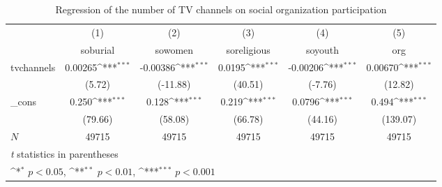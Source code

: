 \begin{table}[htbp]\centering
\def\sym#1{\ifmmode^{#1}\else\(^{#1}\)\fi}
\caption{Regression of the number of TV channels on social organization participation\label{tab1}}
\begin{tabular}{l*{5}{c}}
\hline\hline
            &\multicolumn{1}{c}{(1)}&\multicolumn{1}{c}{(2)}&\multicolumn{1}{c}{(3)}&\multicolumn{1}{c}{(4)}&\multicolumn{1}{c}{(5)}\\
            &\multicolumn{1}{c}{soburial}&\multicolumn{1}{c}{sowomen}&\multicolumn{1}{c}{soreligious}&\multicolumn{1}{c}{soyouth}&\multicolumn{1}{c}{org}\\
\hline
tvchannels  &     0.00265\sym{***}&    -0.00386\sym{***}&      0.0195\sym{***}&    -0.00206\sym{***}&     0.00670\sym{***}\\
            &      (5.72)         &    (-11.88)         &     (40.51)         &     (-7.76)         &     (12.82)         \\
[1em]
\_cons      &       0.250\sym{***}&       0.128\sym{***}&       0.219\sym{***}&      0.0796\sym{***}&       0.494\sym{***}\\
            &     (79.66)         &     (58.08)         &     (66.78)         &     (44.16)         &    (139.07)         \\
\hline
\(N\)       &       49715         &       49715         &       49715         &       49715         &       49715         \\
\hline\hline
\multicolumn{6}{l}{\footnotesize \textit{t} statistics in parentheses}\\
\multicolumn{6}{l}{\footnotesize \sym{*} \(p<0.05\), \sym{**} \(p<0.01\), \sym{***} \(p<0.001\)}\\
\end{tabular}
\end{table}
